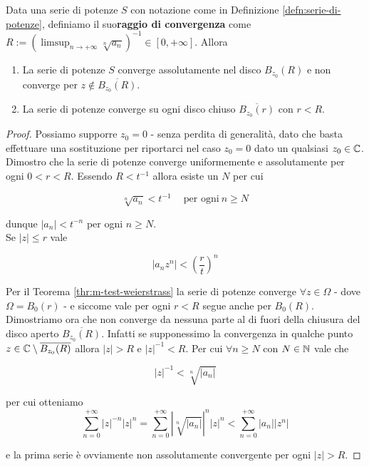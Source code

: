 \begin{theorem}
	\label{thr:criterio-hadamard}
	Data una serie di potenze $S$ con notazione come in Definizione \ref{defn:serie-di-potenze}, definiamo il suo\textbf{raggio di convergenza} come $R := ( \limsup_{n\to+\infty} \sqrt[n]{a_n})^{-1} \in \left[0,+\infty\right]$. Allora 
	\begin{enumerate}
		\item La serie di potenze $S$ converge assolutamente nel disco $B_{z_0}(R)$ e non converge per $z \notin \overline{B_{z_0}(R)}$.
		\item La serie di potenze converge su ogni disco chiuso $\overline{B_{z_0}(r)}$ con $r < R$.  
	\end{enumerate}
\end{theorem}
\begin{proof}
	Possiamo supporre $z_0 = 0$ - senza perdita di generalità, dato che basta effettuare una sostituzione per riportarci nel caso $z_0 = 0$ dato un qualsiasi $z_0 \in \mathbb{C}$.\\ 
	Dimostro che la serie di potenze converge uniformemente e assolutamente per ogni $0 < r < R$. Essendo $R < t^{-1}$ allora esiste un $N$ per cui
	
		\begin{equation*}
		\sqrt[n]{a_n} < t^{-1} \quad\ \text{per ogni}\ n \ge N 
		\end{equation*}
	
	dunque $|a_n| < t^{-n}$ per ogni $n \ge N$. \\ Se $|z| \le r$ vale
	
	\begin{equation*}
	|a_nz^n| < \left(\frac{r}{t}\right)^n
	\end{equation*}
	
	Per il Teorema \ref{thr:m-test-weierstrass} la serie di potenze converge $\forall z \in \Omega$ - dove $\Omega = B_0(r)$ - e siccome vale per ogni $r < R$ segue anche per $B_0(R)$.\\
	
	Dimostriamo ora che non converge da nessuna parte al di fuori della chiusura del disco aperto $\overline{B_{z_0}(R)}$. Infatti se supponessimo la convergenza in qualche punto $z \in \mathbb{C} \setminus \overline{B_{z_0}(R)}$ allora $|z| > R$ e $|z|^{-1} < R$. Per cui $\forall n \ge N$ con $N \in \mathbb{N}$ vale che
	
		\begin{equation*}
		|z|^{-1} < \sqrt[n]{|a_n|}
		\end{equation*}
		
	per cui otteniamo 
	\begin{equation*}	
	\sum^{+\infty}_{n=0}|z|^{-n}|z|^n = 	
		\sum^{+\infty}_{n=0}|\sqrt[n]{|a_n|}|^n|z|^n < 
		\sum^{+\infty}_{n=0}|a_n||z^n| 
	\end{equation*}
	
	e la prima serie è ovviamente non assolutamente convergente per ogni $|z| > R$.
\end{proof}


